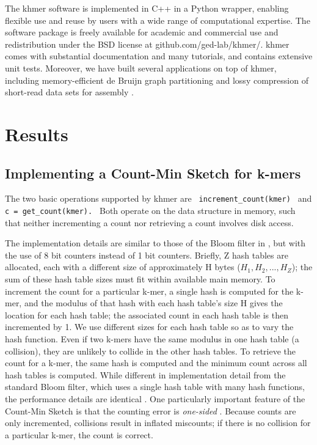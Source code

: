 The khmer software \cite{khmer} is implemented in C++ in a Python
wrapper, enabling flexible use and reuse by users with a wide range of
computational expertise.  The software package is freely available for
academic and commercial use and redistribution under the BSD license
at github.com/ged-lab/khmer/.  khmer comes with substantial
documentation and many tutorials, and contains extensive unit tests.
Moreover, we have built several applications on top of khmer,
including memory-efficient de Bruijn graph partitioning
\cite{Pell2012} and lossy compression of short-read data sets for
assembly \cite{Brown2012}.

\section{Results}

\subsection{Implementing a Count-Min Sketch for k-mers}

The two basic operations supported by khmer are {\tt
  increment\_count(kmer) } and {\tt c = get\_count(kmer). } Both
operate on the data structure in memory, such that neither
incrementing a count nor retrieving a count involves disk access.

The implementation details are similar to those of the Bloom filter in
\cite{Pell2012}, but with the use of 8 bit counters instead of 1 bit
counters.  Briefly, Z hash tables are allocated, each with a different
size of approximately H bytes ($H_1, H_2, ..., H_Z$); the sum of these
hash table sizes must fit within available main memory.  To increment
the count for a particular k-mer, a single hash is computed for the
k-mer, and the modulus of that hash with each hash table's size H
gives the location for each hash table; the associated count in each
hash table is then incremented by 1.  We use different sizes for each
hash table so as to vary the hash function.  Even if two k-mers have
the same modulus in one hash table (a collision), they are unlikely to
collide in the other hash tables.  To retrieve the count for a k-mer,
the same hash is computed and the minimum count across all hash tables
is computed. While different in implementation detail from the
standard Bloom filter, which uses a single hash table with many
hash functions, the performance details are identical \cite{Pell2012}.
% 
One particularly important feature of the Count-Min Sketch is that the
counting error is {\em one-sided} \cite{Cormode2005}.  Because counts
are only incremented, collisions result in inflated miscounts; if
there is no collision for a particular k-mer, the count is correct.

